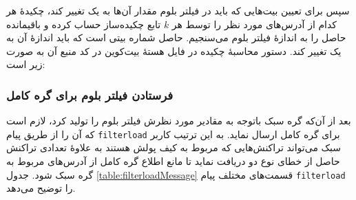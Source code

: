 سپس برای تعیین بیت‌هایی که باید در فیلتر بلوم مقدار آن‌ها به یک تغییر کند، چکیدهٔ هر کدام از آدرس‌های مورد نظر را توسط هر $k$ تابع چکیده‌ساز حساب کرده و باقیمانده‌ حاصل را به اندازهٔ فیلتر بلوم می‌سنجیم. حاصل شماره بیتی است که باید اندازه‌ٔ آن به یک تغییر کند. دستور محاسبهٔ چکیده در فایل  هسته‌ٔ بیت‌کوین در کد منبع آن \cite{Bitcoincore.org}به صورت زیر است:





\subsubsection{فرستادن فیلتر بلوم برای گره کامل}

بعد از آن‌که گره سبک باتوجه به مقادیر مورد نظرش فیلتر بلوم را تولید کرد، لازم است که آن را از طریق پیام \texttt{filterload} برای گره کامل ارسال نماید. به این ترتیب کاربر سبک می‌تواند تراکنش‌هایی که مربوط به کیف پولش هستند به علاوهٔ تعدادی تراکنش حاصل از خطای نوع دو دریافت نماید تا مانع اطلاع گره کامل از آدرس‌های مربوط به گره سبک شود. جدول  \ref{table:filterloadMessage} قسمت‌های مختلف پیام \texttt{filterload} را توضیح می‌دهد.

